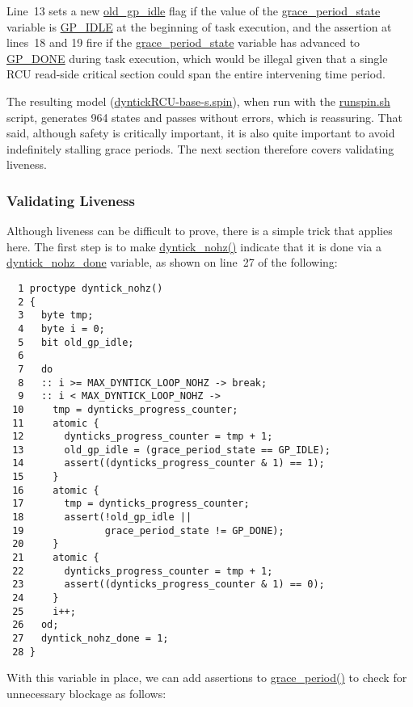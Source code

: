 Line~13 sets a new \url{old_gp_idle} flag if the
value of the \url{grace_period_state} variable is
\url{GP_IDLE} at the beginning of task execution,
and the assertion at lines~18 and 19 fire if the \url{grace_period_state}
variable has advanced to \url{GP_DONE} during task execution,
which would be illegal given that a single RCU read-side critical
section could span the entire intervening time period.

The resulting
model (\url{dyntickRCU-base-s.spin}),
when run with the \url{runspin.sh} script,
generates 964 states and passes without errors, which is reassuring.
That said, although safety is critically important, it is also quite
important to avoid indefinitely stalling grace periods.
The next section therefore covers validating liveness.

\subsubsection{Validating Liveness}
\label{app:formal:Validating Liveness}

Although liveness can be difficult to prove, there is a simple
trick that applies here.
The first step is to make \url{dyntick_nohz()} indicate that
it is done via a \url{dyntick_nohz_done} variable, as shown on
line~27 of the following:

{ \scriptsize
\begin{verbatim}
  1 proctype dyntick_nohz()
  2 {
  3   byte tmp;
  4   byte i = 0;
  5   bit old_gp_idle;
  6 
  7   do
  8   :: i >= MAX_DYNTICK_LOOP_NOHZ -> break;
  9   :: i < MAX_DYNTICK_LOOP_NOHZ ->
 10     tmp = dynticks_progress_counter;
 11     atomic {
 12       dynticks_progress_counter = tmp + 1;
 13       old_gp_idle = (grace_period_state == GP_IDLE);
 14       assert((dynticks_progress_counter & 1) == 1);
 15     }
 16     atomic {
 17       tmp = dynticks_progress_counter;
 18       assert(!old_gp_idle ||
 19              grace_period_state != GP_DONE);
 20     }
 21     atomic {
 22       dynticks_progress_counter = tmp + 1;
 23       assert((dynticks_progress_counter & 1) == 0);
 24     }
 25     i++;
 26   od;
 27   dyntick_nohz_done = 1;
 28 }
\end{verbatim}
}

With this variable in place, we can add assertions to
\url{grace_period()} to check for unnecessary blockage
as follows:

